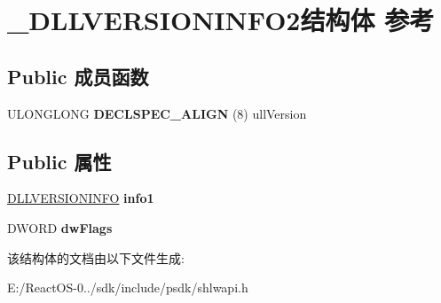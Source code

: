 \hypertarget{struct___d_l_l_v_e_r_s_i_o_n_i_n_f_o2}{}\section{\+\_\+\+D\+L\+L\+V\+E\+R\+S\+I\+O\+N\+I\+N\+F\+O2结构体 参考}
\label{struct___d_l_l_v_e_r_s_i_o_n_i_n_f_o2}
\subsection*{Public 成员函数}
\begin{DoxyCompactItemize}
\item 
\mbox{\label{struct___d_l_l_v_e_r_s_i_o_n_i_n_f_o2_a550f4e95ac7e70a7490b25c8e7e38fe1}} 
U\+L\+O\+N\+G\+L\+O\+NG {\bfseries D\+E\+C\+L\+S\+P\+E\+C\+\_\+\+A\+L\+I\+GN} (8) ull\+Version
\end{DoxyCompactItemize}
\subsection*{Public 属性}
\begin{DoxyCompactItemize}
\item 
\mbox{\label{struct___d_l_l_v_e_r_s_i_o_n_i_n_f_o2_a84eb46a79b623ce49b46d524589faceb}} 
\hyperlink{struct___dll_version_info}{D\+L\+L\+V\+E\+R\+S\+I\+O\+N\+I\+N\+FO} {\bfseries info1}
\item 
\mbox{\label{struct___d_l_l_v_e_r_s_i_o_n_i_n_f_o2_a351c577bcf71ab4a5f7b51f4b6d88c2f}} 
D\+W\+O\+RD {\bfseries dw\+Flags}
\end{DoxyCompactItemize}


该结构体的文档由以下文件生成\+:\begin{DoxyCompactItemize}
\item 
E\+:/\+React\+O\+S-\/0../sdk/include/psdk/shlwapi.\+h\end{DoxyCompactItemize}
